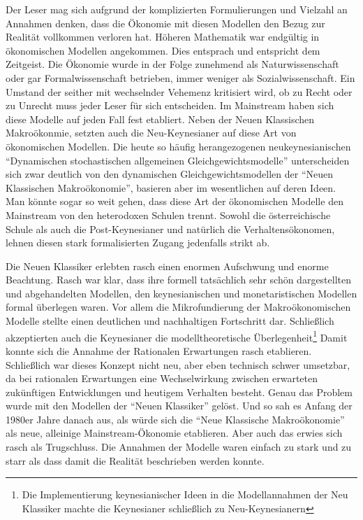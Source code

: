 \begin{enumerate}
	Der Leser mag sich aufgrund der komplizierten Formulierungen und Vielzahl an Annahmen denken, dass die Ökonomie mit diesen Modellen den Bezug zur Realität vollkommen verloren hat. Höheren Mathematik war endgültig in ökonomischen Modellen angekommen. Dies entsprach und entspricht dem Zeitgeist. Die Ökonomie wurde in der Folge zunehmend als Naturwissenschaft oder gar Formalwissenschaft betrieben, immer weniger als Sozialwissenschaft. Ein Umstand der seither mit wechselnder Vehemenz kritisiert wird, ob zu Recht oder zu Unrecht muss jeder Leser für sich entscheiden. Im Mainstream haben sich diese Modelle auf jeden Fall fest etabliert. Neben der Neuen Klassischen Makroökonmie, setzten auch die Neu-Keynesianer auf diese Art von ökonomischen Modellen. Die heute so häufig herangezogenen neukeynesianischen "`Dynamischen stochastischen allgemeinen Gleichgewichtsmodelle"' unterscheiden sich zwar deutlich von den dynamischen Gleichgewichtsmodellen der "`Neuen Klassischen Makroökonomie"', basieren aber im wesentlichen auf deren Ideen.  
	Man könnte sogar so weit gehen, dass diese Art der ökonomischen Modelle den Mainstream von den heterodoxen Schulen trennt. Sowohl die österreichische Schule als auch die Post-Keynesianer und natürlich die Verhaltensökonomen, lehnen diesen stark formalisierten Zugang jedenfalls strikt ab.


\end{enumerate}	


Die Neuen Klassiker erlebten rasch einen enormen Aufschwung und enorme Beachtung. Rasch war klar, dass ihre formell tatsächlich sehr schön dargestellten und abgehandelten Modellen, den keynesianischen und monetaristischen Modellen formal überlegen waren.
Vor allem die Mikrofundierung der Makroökonomischen Modelle stellte einen deutlichen und nachhaltigen Fortschritt dar. Schließlich akzeptierten auch die Keynesianer die modelltheoretische Überlegenheit\footnote{Die Implementierung keynesianischer Ideen in die Modellannahmen der Neu Klassiker machte die Keynesianer schließlich zu Neu-Keynesianern}
Damit konnte sich die Annahme der Rationalen Erwartungen rasch etablieren. Schließlich war dieses Konzept nicht neu, aber eben technisch schwer umsetzbar, da bei rationalen Erwartungen eine Wechselwirkung zwischen erwarteten zukünftigen Entwicklungen und heutigem Verhalten besteht. Genau das Problem wurde mit den Modellen der "`Neuen Klassiker"' gelöst. Und so sah es Anfang der 1980er Jahre danach aus, als würde sich die "`Neue Klassische Makroökonomie"' als neue, alleinige Mainstream-Ökonomie etablieren. Aber auch das erwies sich rasch als Trugschluss. Die Annahmen der Modelle waren einfach zu stark und zu starr als dass damit die Realität beschrieben werden konnte. 
		
